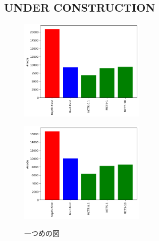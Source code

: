 \subsection{UNDER CONSTRUCTION}
\begin{figure}[htbp]
 \begin{minipage}{0.5\hsize}
  \begin{center}
   \includegraphics[width=60mm]{img/cas/artificial/1/node.png}
  \end{center}
  \label{fig:one}
 \end{minipage}
 \begin{minipage}{0.5\hsize}
  \begin{center}
   \includegraphics[width=60mm]{img/cas/artificial/2/node.png}
  \end{center}
  \label{fig:two}
 \end{minipage}
 \caption{一つめの図}
\end{figure}

